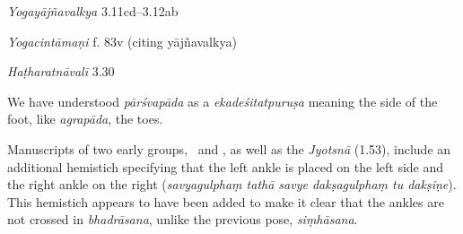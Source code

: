 \begin{ekdosis}
\begin{sources}[hp01_053]
\emph{Yogayājñavalkya} 3.11cd--3.12ab

\begin{versinnote}
\end{versinnote}

\end{sources}

\begin{testimonia}[hp01_053]
\emph{Yogacintāmaṇi} f. 83v (citing yājñavalkya)

\begin{versinnote}
\end{versinnote}

\emph{Haṭharatnāvalī} 3.30 

\begin{versinnote}
\end{versinnote}

\end{testimonia}

\begin{philcomm}[hp01_053]
We have understood \emph{pārśvapāda} as a \emph{ekadeśitatpuruṣa} meaning the side of the foot, like  \emph{agrapāda}, the toes.

Manuscripts of two early groups, \textbeta\ and \textgamma, as well as the \emph{Jyotsnā} (1.53), include an additional hemistich specifying that the left ankle is placed on the left side and the right ankle on the right (\emph{savyagulphaṃ tathā savye dakṣagulphaṃ tu dakṣiṇe}). This hemistich appears to have been added to make it clear that the ankles are not crossed in \emph{bhadrāsana}, unlike the previous pose, \emph{siṃhāsana}.


\end{philcomm}
\end{ekdosis}

